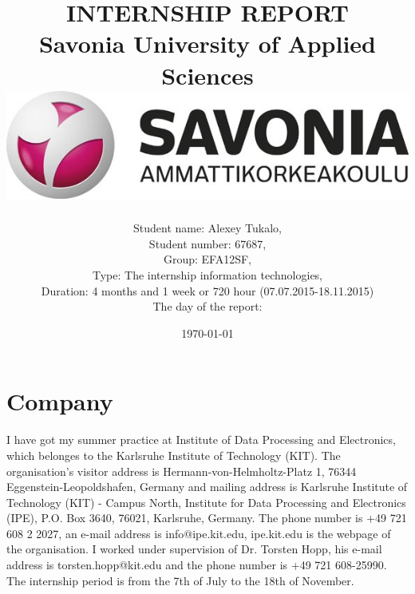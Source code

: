 \documentclass[english]{article}
\date{}
\begin{document}
\title{\vspace{2in}INTERNSHIP REPORT\\
\small Savonia University of Applied Sciences\\
\vspace{0.5in}\includegraphics{savonia.jpg}}

\nopagebreak
\maketitle


\vspace{3in}

\author{
\begin{flushleft}
Student name: Alexey Tukalo,\\
Student number: 67687,\\
Group: EFA12SF,\\
Type: The internship information technologies,\\
Duration: 4 months and 1 week or 720 hour (07.07.2015-18.11.2015)\\
The day of the report: \date{\today}
\end{flushleft}
}

\thispagestyle{empty}

\newpage
\setcounter{page}{1}
\setcounter{tocdepth}{2}
\tableofcontents

\newpage


\section{Company}

I have got my summer practice at Institute of Data Processing and Electronics, which belonges to the Karlsruhe Institute of Technology (KIT). The organisation's visitor address is Hermann-von-Helmholtz-Platz 1, 76344 Eggenstein-Leopoldshafen, Germany and mailing address is Karlsruhe Institute of Technology (KIT) - Campus North, Institute for Data Processing and Electronics (IPE), P.O. Box 3640, 76021, Karlsruhe, Germany. The phone number is +49 721 608 2 2027, an e-mail address is info@ipe.kit.edu, ipe.kit.edu is the webpage of the organisation. I worked under supervision of Dr. Torsten Hopp, his e-mail address is torsten.hopp@kit.edu and the phone number is +49 721 608-25990. The internship period is from the 7th of July to the 18th of November.
\end{document}
